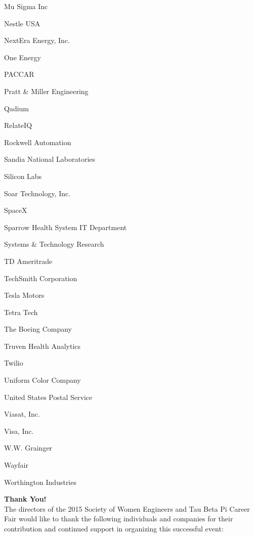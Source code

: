 \documentclass[twoside]{article}
\begin{document}
\begin{center}
\begin{multicols}{5}
\begin{FlushLeft}
\begin{compactitem}
\item Mu Sigma Inc
\item Nestle USA
\item NextEra Energy, Inc.
\item One Energy
\item PACCAR
\item Pratt \& Miller Engineering
\item Qadium
\item RelateIQ
\item Rockwell Automation
\item Sandia National Laboratories
\item Silicon Labs
\item Soar Technology, Inc.
\item SpaceX
\item Sparrow Health System IT Department
\item Systems \& Technology Research
\item TD Ameritrade
\item TechSmith Corporation
\item Tesla Motors
\item Tetra Tech
\item The Boeing Company
\item Truven Health Analytics
\item Twilio
\item Uniform Color Company
\item United States Postal Service
\item Viasat, Inc.
\item Visa, Inc.
\item W.W. Grainger
\item Wayfair
\item Worthington Industries
\end{compactitem}
        \end{FlushLeft}
        \vspace{1em}
        \end{multicols}\end{center}
    \startforewardsection
    { \fontsize{16}{19}\selectfont \bf Thank You!}\\The directors of the 2015 Society of Women Engineers 
    and Tau Beta Pi Career Fair would like to thank the following individuals and 
    companies for their contribution and continued support in organizing this 
    successful event:\\
    
\end{document}
